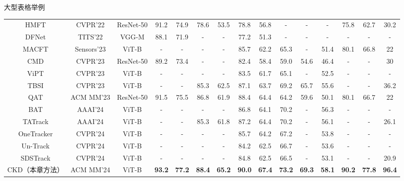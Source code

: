 \documentclass[aspectratio=169]{ahu-slide}
\begin{document}
\begin{frame}{大型表格举例}
\begin{table}[ht]
{\begin{tabular}{c|c|c|cc|cc|cc|ccc|cc|c}
        HMFT & CVPR'22 & ResNet-50 & 91.2 & 74.9 & 78.6 & 53.5 & 78.8 & 56.8 & - & - & -& 75.8 & 62.7  & 30.2 \\
        DFNet & TITS'22 & VGG-M & 88.1 & 71.9 & - & - & 77.2 & 51.3 & - & - & -& - & -   & - \\
       MACFT & Sensors'23 & ViT-B & - & - & - & - & 85.7 & 62.2 & 65.3 & - & 51.4 & 80.1 & 66.8  & 22 \\
        CMD & CVPR'23 & ResNet-50 & 89.2 & 73.4 & - & - & 82.4 & 58.4 & 59.0 & 54.6 & 46.4 & - & -  & 30 \\
        ViPT & CVPR'23 & ViT-B & - & - & - & - & 83.5 & 61.7 & 65.1 & - & 52.5 &- & -  & - \\
        TBSI & CVPR'23 & ViT-B & - & - & 85.3 & 62.5 & 87.1 & 63.7 & 69.2 & 65.7 & 55.6 & - & -  & 36.2 \\
        QAT & ACM MM'23 & ResNet-50 & 91.5 & 75.5 & 86.8 & 61.9 & 88.4 & 64.4 & 64.2 & 59.6 & 50.1 & 80.1 & 66.7 & 22 \\
        BAT & AAAI'24 & ViT-B & - & - & - & - & 86.8 & 64.1 & 70.2 & - & 56.3 & - & -  & - \\
        TATrack & AAAI'24 & ViT-B & - & - & 85.3 & 61.8 & 87.2 & 64.4 & 70.2 & - & 56.1 & - & -  & 26.1 \\
        OneTracker & CVPR'24 & ViT-B & - & - & - & - & 85.7 & 64.2 & 67.2 & - & 53.8 & - & -  & - \\
        Un-Track & CVPR'24 & ViT-B & - & - & - & - & 84.2 & 62.5 & 66.7 & - & 53.6 & - & -  & - \\
        SDSTrack & CVPR'24 & ViT-B & - & - & - & - & 84.8 & 62.5 & 66.5 & - & 53.1 & - & -  &20.9 \\
  		\hline
		CKD（本章方法） & ACM MM'24 & ViT-B & \textbf{93.2} & \textbf{77.2} & \textbf{88.4} & \textbf{65.2} & \textbf{90.0} & \textbf{67.4}  & \textbf{73.2} & \textbf{69.3} & \textbf{58.1}  & \textbf{90.2} & \textbf{77.8} & \textbf{96.4}\\
            \bottomrule
        \end{tabular}
        }
\end{table}
\end{frame}
\end{document}
